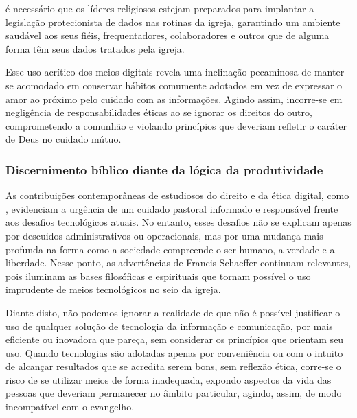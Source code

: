 \begin{citacao}
    é necessário que os líderes religiosos estejam preparados para implantar a legislação protecionista de dados nas rotinas da igreja, garantindo um ambiente saudável aos seus fiéis, frequentadores, colaboradores e outros que de alguma forma têm seus dados tratados pela igreja.
\end{citacao}

Esse uso acrítico dos meios digitais revela uma inclinação pecaminosa de manter-se acomodado em conservar hábitos comumente adotados em vez de expressar o amor ao próximo pelo cuidado com as informações. Agindo assim, incorre-se em negligência de responsabilidades éticas ao se ignorar os direitos do outro, comprometendo a comunhão e violando princípios que deveriam refletir o caráter de Deus no cuidado mútuo.

\subsubsection{Discernimento bíblico diante da lógica da produtividade}

As contribuições contemporâneas de estudiosos do direito e da ética digital, como , evidenciam a urgência de um cuidado pastoral informado e responsável frente aos desafios tecnológicos atuais. No entanto, esses desafios não se explicam apenas por descuidos administrativos ou operacionais, mas por uma mudança mais profunda na forma como a sociedade compreende o ser humano, a verdade e a liberdade. Nesse ponto, as advertências de Francis Schaeffer continuam relevantes, pois iluminam as bases filosóficas e espirituais que tornam possível o uso imprudente de meios tecnológicos no seio da igreja.

Diante disto, não podemos ignorar a realidade de que não é possível justificar o uso de qualquer solução de tecnologia da informação e comunicação, por mais eficiente ou inovadora que pareça, sem considerar os princípios que orientam seu uso. Quando tecnologias são adotadas apenas por conveniência ou com o intuito de alcançar resultados que se acredita serem bons, sem reflexão ética, corre-se o risco de se utilizar meios de forma inadequada, expondo aspectos da vida das pessoas que deveriam permanecer no âmbito particular, agindo, assim, de modo incompatível com o evangelho.

